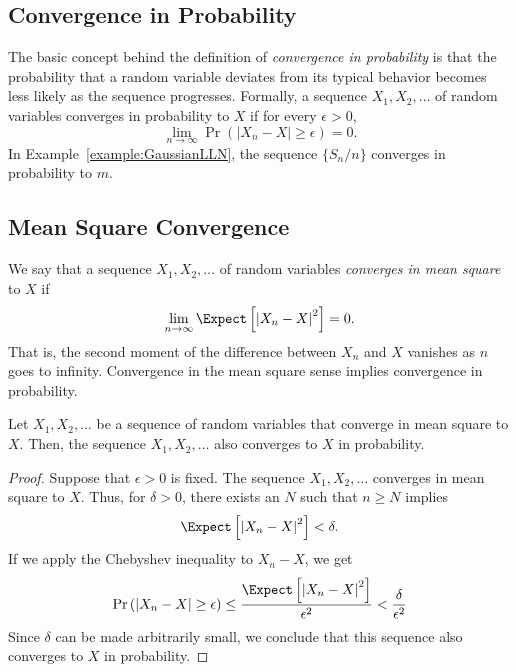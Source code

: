 \subsection{Convergence in Probability}

The basic concept behind the definition of \emph{convergence in probability} is that the probability that a random variable deviates from its typical behavior becomes less likely as the sequence progresses. 
Formally, a sequence $X_1, X_2, \ldots$ of random variables converges in probability to $X$ if for every $\epsilon > 0$,
\begin{equation*}
\lim_{n \rightarrow \infty} \Pr \left( \left| X_n - X \right| \geq \epsilon \right) = 0 .
\end{equation*}
In Example~\ref{example:GaussianLLN}, the sequence $\{ S_n / n \}$ converges in probability to $m$.


\subsection{Mean Square Convergence}

We say that a sequence $X_1, X_2, \ldots$ of random variables \emph{converges in mean square} to $X$ if 
\begin{equation*}
\lim_{n \rightarrow \infty} \Expect \left[ \left| X_n - X \right|^2 \right] = 0 .
\end{equation*}
That is, the second moment of the difference between $X_n$ and $X$ vanishes as $n$ goes to infinity.
Convergence in the mean square sense implies convergence in probability.

\begin{proposition} \label{proposition:ConvergenceImplication1}
Let $X_1, X_2, \ldots$ be a sequence of random variables that converge in mean square to $X$.
Then, the sequence $X_1, X_2, \ldots$ also converges to $X$ in probability.
\end{proposition}
\begin{proof}
Suppose that $\epsilon > 0$ is fixed.
The sequence $X_1, X_2, \ldots$ converges in mean square to $X$.
Thus, for $\delta > 0$, there exists an $N$ such that $n \geq N$ implies
\begin{equation*}
\Expect \left[ \left| X_n - X \right|^2 \right] < \delta .
\end{equation*}
If we apply the Chebyshev inequality to $X_n - X$, we get
\begin{equation*}
\Pr \left( \left| X_n - X \right| \geq \epsilon \right)
\leq \frac{ \Expect \left[ \left| X_n - X \right|^2 \right] }{ \epsilon^2 }
< \frac{ \delta }{ \epsilon^2 }
\end{equation*}
Since $\delta$ can be made arbitrarily small, we conclude that this sequence also converges to $X$ in probability.
\end{proof}

